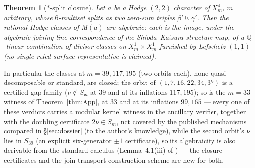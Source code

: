 \documentclass[11pt]{amsart}
\newtheorem{theorem}{Theorem}[section]
\theoremstyle{remark}
\newcommand{\Q}{\mathbb{Q}}
\begin{document}
\begin{theorem}[$*$-split closure]\label{thm:A}
Let $a$ be a Hodge $(2,2)$ character of $X^4_m$, $m$ arbitrary, whose $6$-multiset splits as two zero-sum
triples $\beta'\uplus\gamma'$. Then the rational Hodge classes of $M(a)$ are algebraic:
each is the image, under the algebraic joining-line correspondence of the Shioda--Katsura
structure map, of a $\Q$-linear combination of divisor classes on $X^1_m\times X^1_m$
furnished by Lefschetz $(1,1)$ (no single ruled-surface representative is claimed).
\end{theorem}
In particular the classes at $m=39,117,195$ (two orbits each), none quasi-decomposable or
standard, are closed; the orbit of $(1,7,16,22,34,37)$ is a certified gap family ($\nu\notin S_m$ at $39$ and at its
inflations $117,195$); so is the $m=33$ witness of Theorem~\ref{thm:App}, at $33$ and at its
inflations $99,165$ --- every one of these verdicts carries a modular kernel witness in the
ancillary verifier, together with the doubling certificate $2\nu\in S_m$, not covered by
the published mechanisms compared in \S\ref{sec:dossier} (to the author's knowledge), while the
second orbit's $\nu$ lies in $S_{39}$ (an explicit six-generator $\pm1$ certificate), so its algebraicity is
also derivable from the standard calculus (Lemma~4.1(iii) of \cite{Aoki00}) --- the closure certificates and the join-transport construction scheme are new for both.
\end{document}
